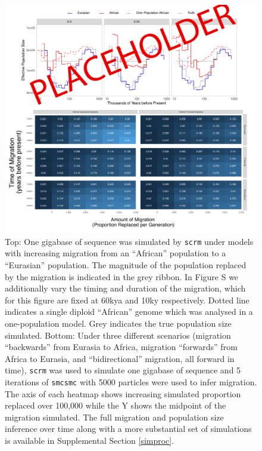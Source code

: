 \documentclass{article}
\begin{document}
\begin{figure}
	\centering
	\includegraphics[width=\textwidth]{../plot/ne/PLACEHOLDER_sims.pdf}
	\caption{Top: One gigabase of sequence was simulated by {\tt scrm} under models with increasing migration from an ``African'' population to a ``Eurasian'' population. The magnitude of the population replaced by the migration is indicated in the grey ribbon. In Figure S we additionally vary the timing and duration of the migration, which for this figure are fixed at 60kya and 10ky respectively. Dotted line indicates a single diploid ``African'' genome which was analysed in a one-population model. Grey indicates the true population size simulated. Bottom: Under three different scenarios (migration ``backwards'' from Eurasia to Africa, migration ``forwards'' from Africa to Eurasia, and ``bidirectional'' migration, all forward in time), {\tt scrm} was used to simulate one gigabase of sequence and 5 iterations of {\tt smcsmc} with 5000 particles were used to infer migration. The axis of each heatmap shows increasing simulated proportion replaced over 100,000 while the Y shows the midpoint of the migration simulated. The full migration and population size inference over time along with a more substantial set of simulations is available in Supplemental Section \ref{simproc}.}
	\label{sim}
\end{figure}
\end{document}
